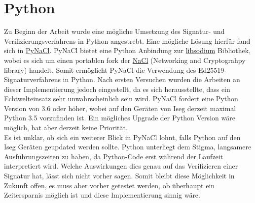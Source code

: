 \documentclass[thesis=bachelor,faculty=cb]{hsmw-thesis}
\begin{document}
\section{Python}
Zu Beginn der Arbeit wurde eine mögliche Umsetzung des Signatur- und Verifizierungsverfahrens in Python angestrebt. Eine mögliche Lösung hierfür fand sich in {\href{https://pypi.org/project/PyNaCl/}{PyNaCl}. PyNaCl bietet eine Python Anbindung zur \href{https://github.com/jedisct1/libsodium}{libsodium} Bibliothek, wobei es sich um einen portablen fork der \href{https://nacl.cr.yp.to/}{NaCl} (Networking and Cryptograhpy library) handelt. Somit ermöglicht PyNaCl die Verwendung des Ed25519-Signaturverfahrens in Python. Nach ersten Versuchen wurden die Arbeiten an dieser Implementierung jedoch eingestellt, da es sich herausstellte, dass ein Echtwelteinsatz sehr unwahrscheinlich sein wird. PyNaCl fordert eine Python Version von 3.6 oder höher, wobei auf den Geräten von Iseg derzeit maximal Python 3.5 vorzufinden ist. Ein mögliches Upgrade der Python Version wäre möglich, hat aber derzeit keine Priorität. 
	\\[1cm]
	Es ist unklar, ob sich ein weiterer Blick in PyNaCl lohnt, falls Python auf den Iseg Geräten geupdated werden sollte. Python unterliegt dem Stigma, langsamere Ausführungszeiten zu haben, da Python-Code erst während der Laufzeit interpretiert wird. Welche Auswirkungen dies genau auf das Verifizieren einer Signatur hat, lässt sich nicht vorher sagen. Somit bleibt diese Möglichkeit in Zukunft offen, es muss aber vorher getestet werden, ob überhaupt ein Zeitersparnis möglich ist und diese Implementierung sinnig wäre.
}
\end{document}
